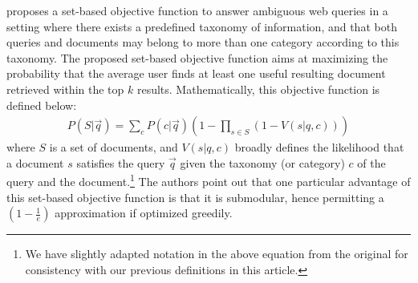 \cite{agrawal09diversifying} proposes a set-based objective function
to answer ambiguous web queries in a setting where there exists a
predefined taxonomy of information, and that both queries and
documents may belong to more than one category according to this
taxonomy. The proposed set-based objective function aims at maximizing
the probability that the average user finds at least one useful
resulting document retrieved within the top $k$
results. Mathematically, this objective function
is defined below:
%
\begin{align}
	P(S|\vec{q}) = \sum_{c} P(c|\vec{q}) \left( 1 - \prod_{s\in S}(1-V(s| q, c))\right) 
\label{eq:diversifykObjectiveFunction}
\end{align}
where $S$ is a set of documents, and $V(s|q, c)$ broadly defines the
likelihood that a document $s$ satisfies the query $\vec{q}$ given the
taxonomy (or category) $c$ of the query and the document.\footnote{We 
have slightly adapted notation in the above equation from the original 
for consistency with our previous definitions in this article.}
The authors point out that one particular advantage of this set-based objective 
function is that it is submodular, hence permitting a $\left( 1 - \frac{1}{e} \right)$
approximation if optimized greedily.

